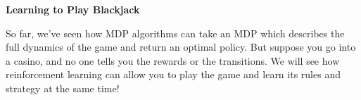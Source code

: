 \item {\bf Learning to Play Blackjack}

So far, we've seen how MDP algorithms can take an MDP which describes the full
dynamics of the game and return an optimal policy.  But suppose you go into a
casino, and no one tells you the rewards or the transitions. We will see how
reinforcement learning can allow you to play the game and learn its rules and
strategy at the same time!

\begin{enumerate}

  

  

  

  

  

  

\end{enumerate}
